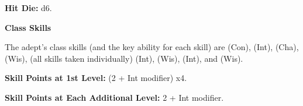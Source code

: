 
\textbf{Hit Die:} d6.

\textbf{Class Skills}

The adept's class skills (and the key ability for each skill) are  
(Con),  (Int),  (Cha),  (Wis),  (all skills taken 
individually) (Int),  (Wis),  (Int), and  (Wis). 

\textbf{Skill Points at 1st Level:} (2 + Int modifier) x4.

\textbf{Skill Points at Each Additional Level:} 2 + Int modifier.

